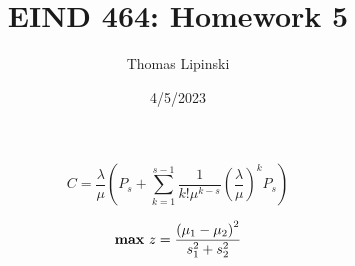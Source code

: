 \documentclass{article}
\title {EIND 464: Homework 5}
\date{4/5/2023}
\author{Thomas Lipinski}
\begin{document}
\[C = \frac{\lambda}{\mu} \left( P_s + \sum_{k=1}^{s-1} \frac{1}{k!\mu^{k-s}} \left( \frac{\lambda}{\mu} \right)^k P_s \right)
\]

\vspace*{2cm}
\[ \text{\textbf{max} } z = \frac{\left(\mu_1 - \mu_2\right)^2}{s_1^2 + s_2^2}
\]
\end{document}
